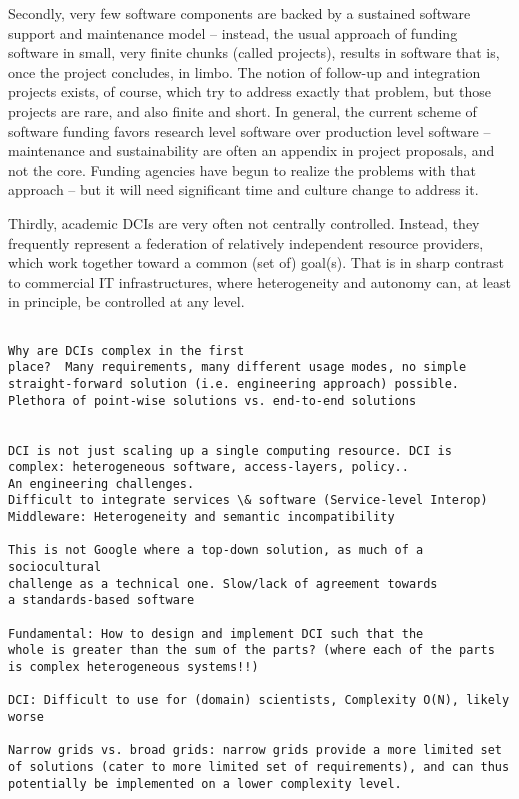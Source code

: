 \documentclass[a4paper,10pt]{article}
\begin{document}
  Secondly, very few software components are backed by a sustained
  software support and maintenance model -- instead, the usual
  approach of funding software in small, very finite chunks (called
  projects), results in software that is, once the project concludes,
  in limbo.  The notion of follow-up and integration projects exists,
  of course, which try to address exactly that problem, but those
  projects are rare, and also finite and short.  In general, the
  current scheme of software funding favors research level software
  over production level software -- maintenance and sustainability are
  often an appendix in project proposals, and not the core.  Funding
  agencies have begun to realize the problems with that approach --
  but it will need significant time and culture change to address it.

  Thirdly, academic DCIs are very often not centrally controlled.
  Instead, they frequently represent a federation of relatively
  independent resource providers, which work together toward a common
  (set of) goal(s).  That is in sharp contrast to commercial IT
  infrastructures, where heterogeneity and autonomy can, at least
  in principle, be controlled at any level.



  



\begin{verbatim}

Why are DCIs complex in the first
place?  Many requirements, many different usage modes, no simple
straight-forward solution (i.e. engineering approach) possible.
Plethora of point-wise solutions vs. end-to-end solutions
 

DCI is not just scaling up a single computing resource. DCI is
complex: heterogeneous software, access-layers, policy.. 
An engineering challenges. 
Difficult to integrate services \& software (Service-level Interop)
Middleware: Heterogeneity and semantic incompatibility

This is not Google where a top-down solution, as much of a sociocultural
challenge as a technical one. Slow/lack of agreement towards
a standards-based software
 
Fundamental: How to design and implement DCI such that the
whole is greater than the sum of the parts? (where each of the parts
is complex heterogeneous systems!!)
 
DCI: Difficult to use for (domain) scientists, Complexity O(N), likely worse

Narrow grids vs. broad grids: narrow grids provide a more limited set
of solutions (cater to more limited set of requirements), and can thus
potentially be implemented on a lower complexity level.

\end{verbatim}
\end{document}
